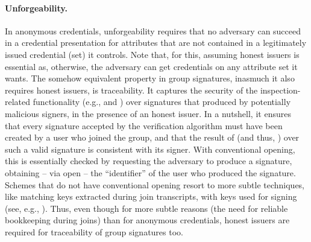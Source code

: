 
\paragraph{Unforgeability.} In anonymous credentials, unforgeability requires
that no adversary can succeed in a credential presentation for attributes that
are not contained in a legitimately issued credential (set) it controls. Note
that, for this, assuming honest issuers is essential as, otherwise, the
adversary can get credentials on any attribute set it wants.
%
The somehow equivalent property in group signatures, inasmuch it also requires
honest issuers, is traceability. It captures the security of the
inspection-related functionality (e.g., \Inspect and \Judge) over signatures
that produced by potentially malicious signers, in the presence of an honest
issuer. In a nutshell, it ensures that every signature accepted by
the verification algorithm must have been created by a user who joined the
group, and that the result of \Inspect (and thus, \Judge) over such a valid
signature is consistent with its signer. With conventional opening, this is
essentially checked by requesting the adversary to produce a signature,
obtaining -- via open -- the ``identifier'' of the user who produced the
signature. Schemes
that do not have conventional opening resort to more subtle techniques, like
matching keys extracted during join transcripts, with keys used for signing
(see, e.g., \cite{dl21}). Thus, even though for more subtle reasons (the need
for reliable bookkeeping during joins) than for anonymous credentials, honest
issuers are required for traceability of group signatures too.

